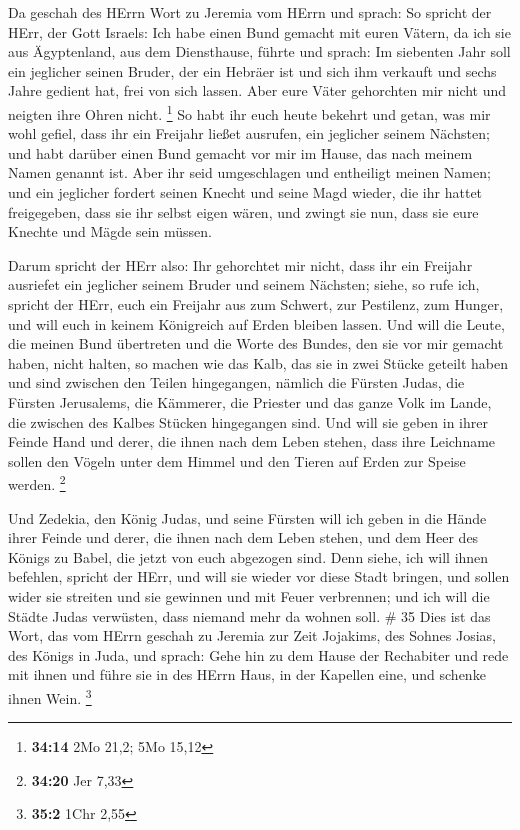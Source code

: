  Da geschah des HErrn Wort zu Jeremia vom HErrn und sprach:
 So spricht der HErr, der Gott Israels: Ich habe einen Bund
gemacht mit euren Vätern, da ich sie aus Ägyptenland, aus dem
Diensthause, führte und sprach:  Im siebenten Jahr soll ein
jeglicher seinen Bruder, der ein Hebräer ist und sich ihm verkauft und
sechs Jahre gedient hat, frei von sich lassen. Aber eure Väter
gehorchten mir nicht und neigten ihre Ohren nicht. \footnote{\textbf{34:14}
  2Mo 21,2; 5Mo 15,12}  So habt ihr euch heute bekehrt und
getan, was mir wohl gefiel, dass ihr ein Freijahr ließet ausrufen, ein
jeglicher seinem Nächsten; und habt darüber einen Bund gemacht vor mir
im Hause, das nach meinem Namen genannt ist.  Aber ihr seid
umgeschlagen und entheiligt meinen Namen; und ein jeglicher fordert
seinen Knecht und seine Magd wieder, die ihr hattet freigegeben, dass
sie ihr selbst eigen wären, und zwingt sie nun, dass sie eure Knechte
und Mägde sein müssen.

 Darum spricht der HErr also: Ihr gehorchtet mir nicht,
dass ihr ein Freijahr ausriefet ein jeglicher seinem Bruder und seinem
Nächsten; siehe, so rufe ich, spricht der HErr, euch ein Freijahr aus
zum Schwert, zur Pestilenz, zum Hunger, und will euch in keinem
Königreich auf Erden bleiben lassen.  Und will die Leute,
die meinen Bund übertreten und die Worte des Bundes, den sie vor mir
gemacht haben, nicht halten, so machen wie das Kalb, das sie in zwei
Stücke geteilt haben und sind zwischen den Teilen hingegangen,
 nämlich die Fürsten Judas, die Fürsten Jerusalems, die
Kämmerer, die Priester und das ganze Volk im Lande, die zwischen des
Kalbes Stücken hingegangen sind.  Und will sie geben in
ihrer Feinde Hand und derer, die ihnen nach dem Leben stehen, dass ihre
Leichname sollen den Vögeln unter dem Himmel und den Tieren auf Erden
zur Speise werden. \footnote{\textbf{34:20} Jer 7,33}

 Und Zedekia, den König Judas, und seine Fürsten will ich
geben in die Hände ihrer Feinde und derer, die ihnen nach dem Leben
stehen, und dem Heer des Königs zu Babel, die jetzt von euch abgezogen
sind.  Denn siehe, ich will ihnen befehlen, spricht der
HErr, und will sie wieder vor diese Stadt bringen, und sollen wider sie
streiten und sie gewinnen und mit Feuer verbrennen; und ich will die
Städte Judas verwüsten, dass niemand mehr da wohnen soll. \# 35
 Dies ist das Wort, das vom HErrn geschah zu Jeremia zur
Zeit Jojakims, des Sohnes Josias, des Königs in Juda, und sprach:
 Gehe hin zu dem Hause der Rechabiter und rede mit ihnen und
führe sie in des HErrn Haus, in der Kapellen eine, und schenke ihnen
Wein. \footnote{\textbf{35:2} 1Chr 2,55}

